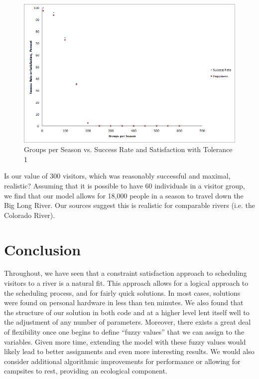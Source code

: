 \documentclass[11pt]{article} %
\begin{document}
\begin{figure}[h]
  \centering
  \includegraphics[scale=.6]{imgs/Graph_VistorsChanges_Tolerance1.png}
  \caption{Groups per Season vs. Success Rate and Satisfaction with Tolerance 1}
  \label{fig:visitors-t1}
\end{figure}

Is our value of 300 visitors, which was reasonably successful and maximal,
realistic?  Assuming that it is possible to have 60 individuals in a visitor
group, we find that our model allows for 18,000 people in a season to travel
down the Big Long River.  Our sources suggest this is realistic for
comparable rivers (i.e. the Colorado River)\cite{ColoradoRiverPaper}.

\section{Conclusion}
\label{sec:conclusions}
Throughout, we have seen that a constraint satisfaction approach to scheduling
visitors to a river is a natural fit.  This approach allows for a logical
approach to the scheduling process, and for fairly quick solutions.  In most
cases, solutions were found on personal hardware in less than ten minutes.
We also found that the structure of our solution in both code and at a
higher level lent itself well to the adjustment of any number of parameters.
Moreover, there exists a great deal of flexibility once one begins to define
``fuzzy values'' that we can assign to the variables.  Given more time,
extending the model with these fuzzy values would likely lead to better
assignments and even more interesting results.  We would also consider 
additional algorithmic improvements for performance or allowing for campsites 
to rest, providing an ecological component.
\end{document}
